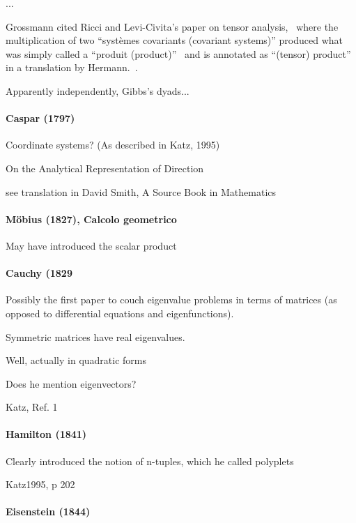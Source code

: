 ...

Grossmann cited Ricci and Levi-Civita's paper on tensor analysis,~\cite{Ricci1900} where the multiplication of two ``systèmes covariants (covariant systems)'' produced what was simply called a ``produit (product)''~\cite[p. 133]{Ricci1900} and is annotated as ``(tensor) product'' in a translation by Hermann.~\cite[p. 28]{Hermann1975}.

Apparently independently, Gibbs's dyads...



\paragraph{Caspar (1797)}

Coordinate systems? (As described in Katz, 1995)

On the Analytical Representation of Direction

see translation in David Smith, A Source Book in Mathematics

\paragraph{Möbius (1827), Calcolo geometrico}

May have introduced the scalar product



\paragraph{Cauchy (1829}

Possibly the first paper to couch eigenvalue problems in terms of matrices (as
opposed to differential equations and eigenfunctions).

Symmetric matrices have real eigenvalues.

Well, actually in quadratic forms

Does he mention eigenvectors?

Katz, Ref. 1

\paragraph{Hamilton (1841)}

Clearly introduced the notion of n-tuples, which he called polyplets


Katz1995, p 202



\paragraph{Eisenstein (1844)~\cite{Eisenstein1844}}

